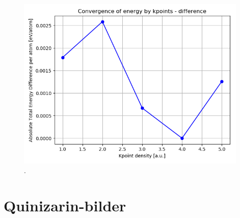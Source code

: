 \documentclass{article}
\begin{document}
  \begin{figure}[H]
      \centering
      \includegraphics[width = 11cm]{../fig/convergence_kpoints_difference.png}
      \caption{. }
      \label{fig:convergence_kpoints_difference.png}
  \end{figure}

\vspace{1cm}

\section{Quinizarin-bilder}

\end{document}
